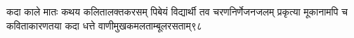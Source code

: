 %
%
%
%
%
%
%
%
%
%
%
%
%

\fourlineindentedshlokanum
{कदा काले मातः कथय कलितालक्तकरसम्}
{पिबेयं विद्यार्थी तव चरणनिर्णेजनजलम्}
{प्रकृत्या मूकानामपि च कविताकारणतया}
{कदा धत्ते वाणीमुखकमलताम्बूलरसताम्}{९८}

